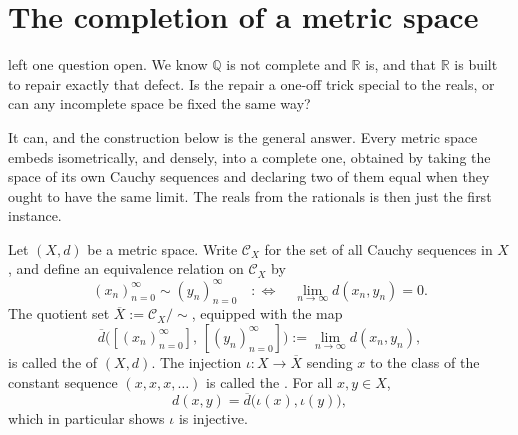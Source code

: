 \section{The completion of a metric space}
\label{sec:completion_of_a_metric_space}

 left one question open. We know $\mathbb{Q}$ is not complete and
$\mathbb{R}$ is, and that $\mathbb{R}$ is built to repair exactly that defect. Is the repair a
one-off trick special to the reals, or can any incomplete space be fixed the same way?

It can, and the construction below is the general answer. Every metric space embeds isometrically,
and densely, into a complete one, obtained by taking the space of its own Cauchy sequences and
declaring two of them equal when they ought to have the same limit. The reals from the rationals
is then just the first instance.

\begin{definition}
\label{def:completion_of_metric_space}
Let $(X,d)$ be a metric space. Write $\mathcal{C}_X$ for the set of all Cauchy sequences in $X$,
and define an equivalence relation on $\mathcal{C}_X$ by
\[(x_n)_{n=0}^\infty \sim (y_n)_{n=0}^\infty \quad :\Longleftrightarrow\quad \lim_{n\to\infty}d(x_n,y_n) = 0.\]
The quotient set $\overline X := \mathcal{C}_X/{\sim}$, equipped with the map
\[\overline d\big([(x_n)_{n=0}^\infty],\,[(y_n)_{n=0}^\infty]\big) := \lim_{n\to\infty}d(x_n,y_n),\]
is called the   of $(X,d)$. The injection
$\iota : X \to \overline X$ sending $x$ to the class of the constant sequence $(x,x,x,\dots)$ is
called the . For all $x,y \in X$,
\[d(x,y) = \overline d\big(\iota(x),\iota(y)\big),\]
which in particular shows $\iota$ is injective.
\end{definition}

